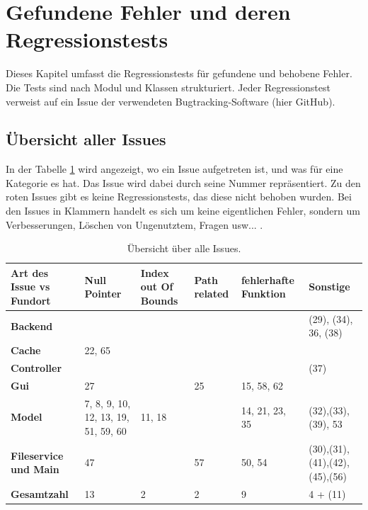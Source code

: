 \documentclass[parskip=full]{scrartcl}
\begin{document}
\clearpage
\section{Gefundene Fehler und deren Regressionstests} \label{regression}

Dieses Kapitel umfasst die Regressionstests für gefundene und behobene Fehler. Die Tests sind nach Modul und Klassen strukturiert. Jeder Regressionstest verweist auf ein Issue der verwendeten Bugtracking-Software (hier GitHub).

\subsection{Übersicht aller Issues}
In der Tabelle \ref{issueOverView} wird angezeigt, wo ein Issue aufgetreten ist, und was für eine Kategorie es hat. Das Issue wird dabei durch seine Nummer repräsentiert. Zu den roten Issues gibt es keine Regressionstests, das diese nicht behoben wurden. Bei den Issues in Klammern handelt es sich um keine eigentlichen Fehler, sondern um Verbesserungen, Löschen von Ungenutztem, Fragen usw... .

\begin{table}[h]
\begin{tabular}{| p{3cm} | p{} | p{}  |p{} |p{} |p{}|}
	\hline
	\textbf{Art des Issue vs Fundort} & \textbf{Null Pointer} & \textbf{Index out Of Bounds} & \textbf{Path related} & \textbf{fehlerhafte Funktion} & \textbf{Sonstige} \\ \hline
	\textbf{Backend}
	& 
	
	&
	
	&
	
	&
	
	&
	(29), (34), 36, (38)
	\\ \hline
	
	\textbf{Cache}
	& 
	22, 65
	&
		
	&
	&
	&
	\\ \hline
	
	\textbf{Controller}
	& 
	
	&

	&
	&
	&
	(37)
	\\ \hline
	\textbf{Gui}
	& 
	27
	&
	&
	25
	
	&
	15, 58, 62
	&
	\\ \hline
	
	\textbf{Model}
	& 
	7, 8, 9, 10, 12, 13, 19, 51, 59, 60
	&
	11, 18
	&	
	
	&
	14, 21, 23, 35
	&
	(32),(33), (39), 53
	\\ \hline
	
	\textbf{Fileservice und Main}
	& 
	47
	&
	
	&
	57
	&
	50, 54
	&
	(30),(31),(41),(42),(45),(56)	
	\\ \hline

	\textbf{Gesamtzahl}
	&
	13
	&
	2
	&
	2
	&
	9
	&
	4 + (11)
	\\ \hline
	
\end{tabular}
\caption{Übersicht über alle Issues.}
\label{issueOverView}
\end{table}
\end{document}
